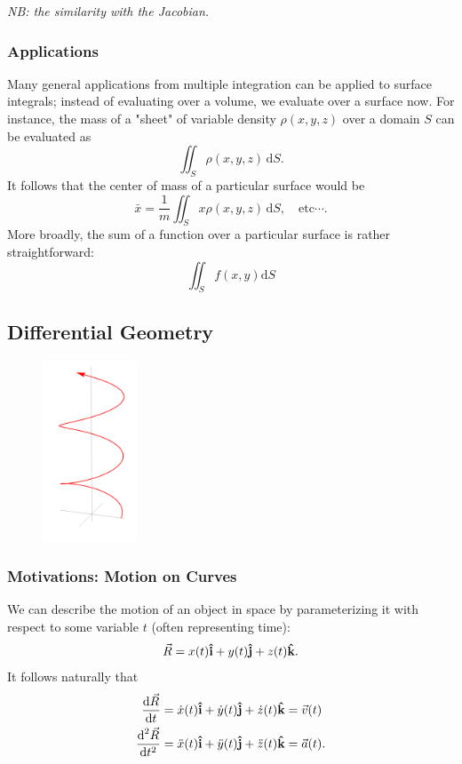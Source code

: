 \documentclass[12pt]{article}
\begin{document}
{\begin{itemize}
\textit{NB: the similarity with the Jacobian.}
\end{itemize}

\subsubsection{Applications}

Many general applications from multiple integration can be applied to surface integrals; instead of evaluating over a volume, we evaluate over a surface now. For instance, the mass of a "sheet" of variable density $\rho(x,y,z)$ over a domain $S$ can be evaluated as \[\iint_{S} \rho(x,y,z) \, \text{d}S.\] It follows that the center of mass of a particular surface would be \[\bar{x} = \frac{1}{m} \iint_{S}x \rho(x,y,z) \, \text{d}S, \quad \text{etc}\cdots.\] More broadly, the sum of a function over a particular surface is rather straightforward: \[\iint_{S} f(x,y) \text{d}S\]
\subsection{Differential Geometry}
\begin{figure}[!ht]
    \centering
    \includegraphics[width=0.25\textwidth]{./misc/curvey.png}
\end{figure}
\subsubsection{Motivations: Motion on Curves}

We can describe the motion of an object in space by parameterizing it with respect to some variable $t$ (often representing time): \[\vec{R} = x(t) \vu{i} + y(t) \vu{j} + z(t) \vu{k}.\] It follows naturally that \begin{align*}
    \frac{\text{d}\vec{R}}{\text{d}t} &= \dot{x}(t) \vu{i} + \dot{y}(t) \vu{j} + \dot{z}(t) \vu{k} = \vec{v}(t)\\
    \frac{\text{d}^2\vec{R}}{\text{d}t^2} &= \ddot{x}(t) \vu{i} + \ddot{y}(t) \vu{j} + \ddot{z}(t) \vu{k} = \vec{a}(t).
\end{align*}

}
\end{document}

